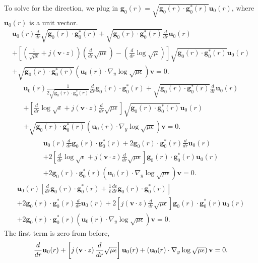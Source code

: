 \documentclass{article}
\theoremstyle{plain}
\begin{document}
To solve for the direction, we plug in $\mathbf{g}_0(r) = \sqrt{\mathbf{g}_0(r)\cdot\mathbf{g}^*_0(r)}\mathbf{u}_0(r)$, where $\mathbf{u}_0(r)$ is a unit vector.
\begin{multline}
	\mathbf{u}_0(r)\frac{d}{dr}\sqrt{\mathbf{g}_0(r)\cdot\mathbf{g}^*_0(r)} + \sqrt{\mathbf{g}_0(r)\cdot\mathbf{g}^*_0(r)}\frac{d}{dr}\mathbf{u}_0(r) \\ + \left[ \left(\frac{1}{\sqrt{\mu\epsilon}}+j\left(\mathbf{v}\cdot z\right)\right)\left(\frac{d}{dr}\sqrt{\mu\epsilon}\right) - \left(\frac{d}{dr}\log{\sqrt{\mu}}\right) \right]\sqrt{\mathbf{g}_0(r)\cdot\mathbf{g}^*_0(r)}\mathbf{u}_0(r) \\ + \sqrt{\mathbf{g}_0(r)\cdot\mathbf{g}^*_0(r)}\left( \mathbf{u}_0(r)\cdot\nabla_y\log{\sqrt{\mu\epsilon}} \right)\mathbf{v} = 0.
\end{multline}
\begin{multline}
	\mathbf{u}_0(r)\frac{1}{2\sqrt{\mathbf{g}_0(r)\cdot\mathbf{g}^*_0(r)}}\frac{d}{dr}\mathbf{g}_0(r)\cdot\mathbf{g}^*_0(r) + \sqrt{\mathbf{g}_0(r)\cdot\mathbf{g}^*_0(r)}\frac{d}{dr}\mathbf{u}_0(r) \\ + \left[ \frac{d}{dr}\log{\sqrt{\epsilon}} + j\left(\mathbf{v}\cdot z\right)\frac{d}{dr}\sqrt{\mu\epsilon} \right]\sqrt{\mathbf{g}_0(r)\cdot\mathbf{g}^*_0(r)}\mathbf{u}_0(r) \\ + \sqrt{\mathbf{g}_0(r)\cdot\mathbf{g}^*_0(r)}\left( \mathbf{u}_0(r)\cdot\nabla_y\log{\sqrt{\mu\epsilon}} \right)\mathbf{v} = 0.
\end{multline}
\begin{multline}
	\mathbf{u}_0(r)\frac{d}{dr}\mathbf{g}_0(r)\cdot\mathbf{g}^*_0(r) + 2\mathbf{g}_0(r)\cdot\mathbf{g}^*_0(r)\frac{d}{dr}\mathbf{u}_0(r) \\ + 2\left[ \frac{d}{dr}\log{\sqrt{\epsilon}} + j\left(\mathbf{v}\cdot z\right)\frac{d}{dr}\sqrt{\mu\epsilon} \right]\mathbf{g}_0(r)\cdot\mathbf{g}^*_0(r)\mathbf{u}_0(r) \\ + 2\mathbf{g}_0(r)\cdot\mathbf{g}^*_0(r)\left( \mathbf{u}_0(r)\cdot\nabla_y\log{\sqrt{\mu\epsilon}} \right)\mathbf{v} = 0.
\end{multline}
\begin{multline}
	\mathbf{u}_0(r)\left[ \frac{d}{dr}\mathbf{g}_0(r)\cdot\mathbf{g}^*_0(r) + \frac{1}{\epsilon}\frac{d\epsilon}{dr}\mathbf{g}_0(r)\cdot\mathbf{g}^*_0(r) \right] \\ + 2\mathbf{g}_0(r)\cdot\mathbf{g}^*_0(r)\frac{d}{dr}\mathbf{u}_0(r) + 2\left[ j\left(\mathbf{v}\cdot z\right)\frac{d}{dr}\sqrt{\mu\epsilon} \right]\mathbf{g}_0(r)\cdot\mathbf{g}^*_0(r)\mathbf{u}_0(r) \\ + 2\mathbf{g}_0(r)\cdot\mathbf{g}^*_0(r)\left( \mathbf{u}_0(r)\cdot\nabla_y\log{\sqrt{\mu\epsilon}} \right)\mathbf{v} = 0.
\end{multline}
The first term is zero from before,
\begin{equation}
	\frac{d}{dr}\mathbf{u}_0(r) \\ + \left[ j\left(\mathbf{v}\cdot z\right)\frac{d}{dr}\sqrt{\mu\epsilon} \right]\mathbf{u}_0(r) \\ + \left( \mathbf{u}_0(r)\cdot\nabla_y\log{\sqrt{\mu\epsilon}} \right)\mathbf{v} = 0.
\end{equation}
\end{document}
